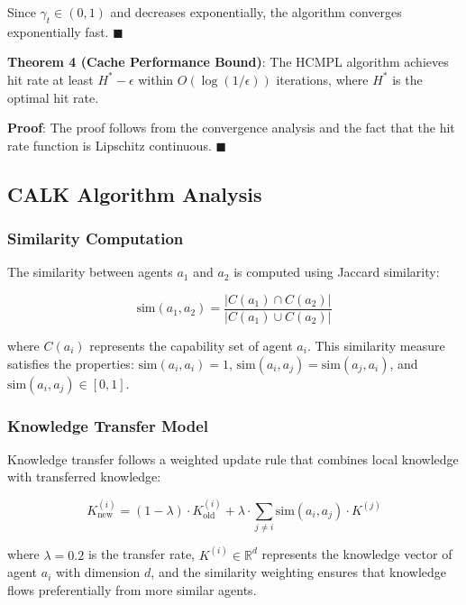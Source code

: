 \documentclass[conference]{IEEEtran}
\begin{document}
Since $\gamma_t \in (0,1)$ and decreases exponentially, the algorithm converges exponentially fast. $\blacksquare$

\textbf{Theorem 4 (Cache Performance Bound)}: The HCMPL algorithm achieves hit rate at least $H^* - \epsilon$ within $O(\log(1/\epsilon))$ iterations, where $H^*$ is the optimal hit rate.

\textbf{Proof}: The proof follows from the convergence analysis and the fact that the hit rate function is Lipschitz continuous. $\blacksquare$

\subsection{CALK Algorithm Analysis}

\subsubsection{Similarity Computation}

The similarity between agents $a_1$ and $a_2$ is computed using Jaccard similarity:

\begin{equation}
\text{sim}(a_1, a_2) = \frac{|C(a_1) \cap C(a_2)|}{|C(a_1) \cup C(a_2)|}
\end{equation}

where $C(a_i)$ represents the capability set of agent $a_i$. This similarity measure satisfies the properties: $\text{sim}(a_i, a_i) = 1$, $\text{sim}(a_i, a_j) = \text{sim}(a_j, a_i)$, and $\text{sim}(a_i, a_j) \in [0,1]$.

\subsubsection{Knowledge Transfer Model}

Knowledge transfer follows a weighted update rule that combines local knowledge with transferred knowledge:

\begin{equation}
K_{\text{new}}^{(i)} = (1-\lambda) \cdot K_{\text{old}}^{(i)} + \lambda \cdot \sum_{j \neq i} \text{sim}(a_i, a_j) \cdot K^{(j)}
\end{equation}

where $\lambda = 0.2$ is the transfer rate, $K^{(i)} \in \mathbb{R}^d$ represents the knowledge vector of agent $a_i$ with dimension $d$, and the similarity weighting ensures that knowledge flows preferentially from more similar agents.
\end{document}
